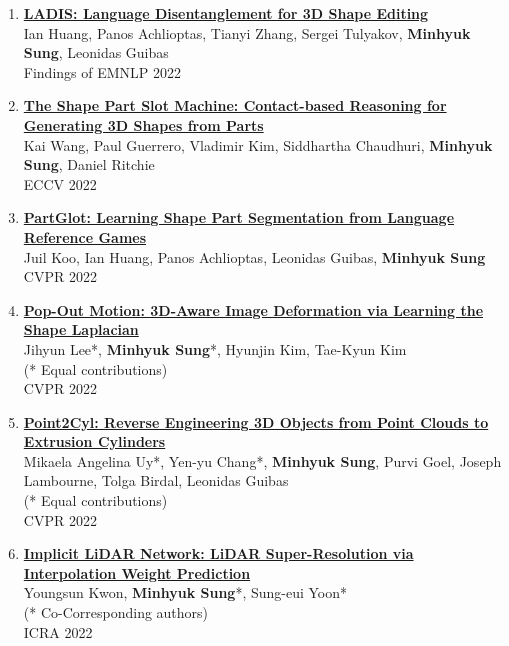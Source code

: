 \documentclass[letterpaper,10pt]{article} %
\newcommand{\blankline}{\quad\pagebreak[2]}
\begin{document}
{{\begin{enumerate}
\item \label{emnlp22}
\href{https://arxiv.org/abs/2212.05011}{\textbf{LADIS: Language Disentanglement for 3D Shape Editing}}\\
Ian Huang, Panos Achlioptas, Tianyi Zhang, Sergei Tulyakov, \textbf{Minhyuk Sung}, Leonidas Guibas \\
Findings of EMNLP 2022\\
\blankline

\item \label{eccv22}
\href{https://arxiv.org/abs/2112.00584}{\textbf{The Shape Part Slot Machine: Contact-based Reasoning for Generating 3D Shapes from Parts}}\\
Kai Wang, Paul Guerrero, Vladimir Kim, Siddhartha Chaudhuri, \textbf{Minhyuk Sung}, Daniel Ritchie\\
ECCV 2022\\
\blankline

\item \label{cvpr22_2}
\href{https://arxiv.org/abs/2112.06390}{\textbf{PartGlot: Learning Shape Part Segmentation from Language Reference Games}}\\
Juil Koo, Ian Huang, Panos Achlioptas, Leonidas Guibas, \textbf{Minhyuk Sung}\\
CVPR 2022\\
\blankline

\item \label{cvpr22_2}
\href{https://arxiv.org/abs/2203.15235}{\textbf{Pop-Out Motion: 3D-Aware Image Deformation via Learning the Shape Laplacian}}\\
Jihyun Lee*, \textbf{Minhyuk Sung}*, Hyunjin Kim, Tae-Kyun Kim\\
(* Equal contributions)\\
CVPR 2022\\
\blankline

\item \label{cvpr22_1}
\href{https://arxiv.org/abs/2109.02259}{\textbf{Point2Cyl: Reverse Engineering 3D Objects from Point Clouds to Extrusion Cylinders}}\\
Mikaela Angelina Uy*, Yen-yu Chang*, \textbf{Minhyuk Sung}, Purvi Goel, Joseph Lambourne, Tolga Birdal, Leonidas Guibas\\
(* Equal contributions)\\
CVPR 2022\\
\blankline

\item \label{icra22}
\href{https://arxiv.org/abs/2203.06413}{\textbf{Implicit LiDAR Network: LiDAR Super-Resolution via Interpolation Weight Prediction}}\\
Youngsun Kwon, \textbf{Minhyuk Sung}*, Sung-eui Yoon*\\
(* Co-Corresponding authors)\\
ICRA 2022\\
\blankline


\end{enumerate}}}
\end{document}
